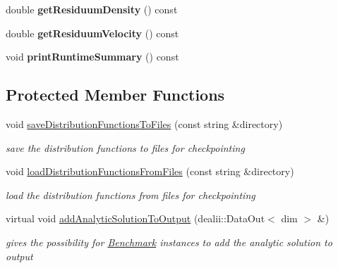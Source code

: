 \begin{DoxyCompactItemize}
\item 
\hypertarget{classnatrium_1_1CFDSolver_a1a508263caff799245a183989efd6680}{
double {\bfseries getResiduumDensity} () const }
\label{classnatrium_1_1CFDSolver_a1a508263caff799245a183989efd6680}

\item 
\hypertarget{classnatrium_1_1CFDSolver_a051ad2daa843e9edf9f1243b3c062686}{
double {\bfseries getResiduumVelocity} () const }
\label{classnatrium_1_1CFDSolver_a051ad2daa843e9edf9f1243b3c062686}

\item 
\hypertarget{classnatrium_1_1CFDSolver_adcec28e954e67146878eaffa5bd1e005}{
void {\bfseries printRuntimeSummary} () const }
\label{classnatrium_1_1CFDSolver_adcec28e954e67146878eaffa5bd1e005}

\end{DoxyCompactItemize}
\subsection*{Protected Member Functions}
\begin{DoxyCompactItemize}
\item 
\hypertarget{classnatrium_1_1CFDSolver_a9a2592ea549fa10427c84f0a1e380c1e}{
void \hyperlink{classnatrium_1_1CFDSolver_a9a2592ea549fa10427c84f0a1e380c1e}{saveDistributionFunctionsToFiles} (const string \&directory)}
\label{classnatrium_1_1CFDSolver_a9a2592ea549fa10427c84f0a1e380c1e}

\begin{DoxyCompactList}\small\item\em save the distribution functions to files for checkpointing \item\end{DoxyCompactList}\item 
\hypertarget{classnatrium_1_1CFDSolver_a42245d22e289d079a3b06a0c26f50050}{
void \hyperlink{classnatrium_1_1CFDSolver_a42245d22e289d079a3b06a0c26f50050}{loadDistributionFunctionsFromFiles} (const string \&directory)}
\label{classnatrium_1_1CFDSolver_a42245d22e289d079a3b06a0c26f50050}

\begin{DoxyCompactList}\small\item\em load the distribution functions from files for checkpointing \item\end{DoxyCompactList}\item 
\hypertarget{classnatrium_1_1CFDSolver_a9107b3f462bddc5b7988ec93f78797c2}{
virtual void \hyperlink{classnatrium_1_1CFDSolver_a9107b3f462bddc5b7988ec93f78797c2}{addAnalyticSolutionToOutput} (dealii::DataOut$<$ dim $>$ \&)}
\label{classnatrium_1_1CFDSolver_a9107b3f462bddc5b7988ec93f78797c2}

\begin{DoxyCompactList}\small\item\em gives the possibility for \hyperlink{classnatrium_1_1Benchmark}{Benchmark} instances to add the analytic solution to output \item\end{DoxyCompactList}\end{DoxyCompactItemize}
